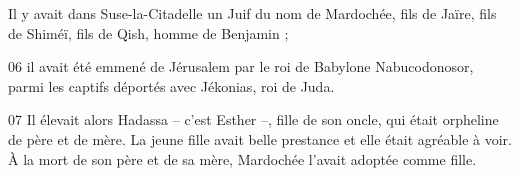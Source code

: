 Il y avait dans Suse-la-Citadelle un Juif du nom de Mardochée, fils de Jaïre, fils de Shiméï, fils de Qish, homme de Benjamin ;

06 il avait été emmené de Jérusalem par le roi de Babylone Nabucodonosor, parmi les captifs déportés avec Jékonias, roi de Juda.

07 Il élevait alors Hadassa – c’est Esther –, fille de son oncle, qui était orpheline de père et de mère. La jeune fille avait belle prestance et elle était agréable à voir. À la mort de son père et de sa mère, Mardochée l’avait adoptée comme fille.
